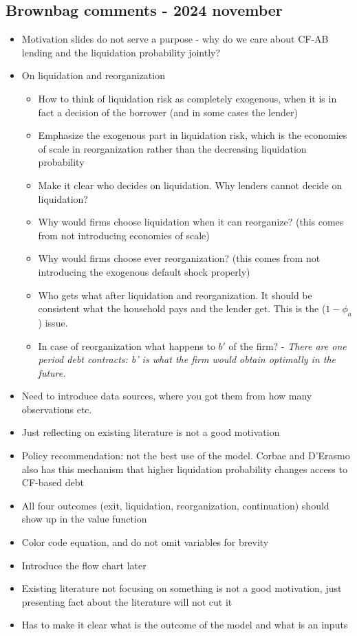 \documentclass[12pt]{article}
\begin{document}
\subsection*{Brownbag comments - 2024 november} 
\begin{itemize} \setlength\itemsep{0em}  \small
    \item Motivation slides do not serve a purpose - why do we care about CF-AB lending and the liquidation probability jointly?
    \item On liquidation and reorganization
    \begin{itemize}
    \item How to think of liquidation risk as completely exogenous, when it is in fact a decision of the borrower (and in some cases the lender) 
    \item Emphasize the exogenous part in liquidation risk, which is the economies of scale in reorganization rather than the decreasing liquidation probability
    \item Make it clear who decides on liquidation. Why lenders cannot decide on liquidation?
    \item Why would firms choose liquidation when it can reorganize? (this comes from not introducing economies of scale)
    \item Why would firms choose ever reorganization? (this comes from not introducing the exogenous default shock properly)
    \item Who gets what after liquidation and reorganization. It should be consistent what the household pays and the lender get. This is the ($1-\phi_a$) issue. 
    \item In case of reorganization what happens to $b'$ of the firm? - \textit{There are one period debt contracts: b' is what the firm would obtain optimally in the future.} 
\end{itemize}
    \item Need to introduce data sources, where you got them from how many observations etc. 
    \item Just reflecting on existing literature is not a good motivation
    \item Policy recommendation: not the best use of the model. Corbae and D'Erasmo also has this mechanism that higher liquidation probability changes access to CF-based debt
    \item All four outcomes (exit, liquidation, reorganization, continuation) should show up in the value function
    \item Color code equation, and  do not omit variables for brevity
    \item Introduce the flow chart later
    \item Existing literature not focusing on something is not a good motivation, just presenting fact about the literature will not cut it
    \item Has to make it clear what is the outcome of the model and what is an inputs
\end{itemize}
\end{document}
